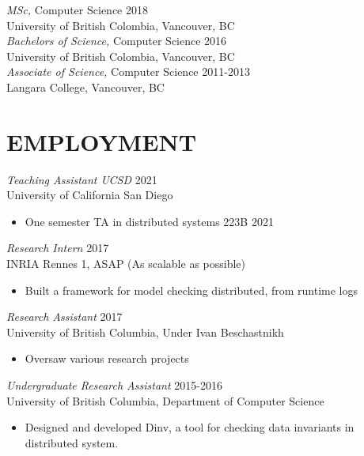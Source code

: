 \documentclass[line,margin]{res}
\begin{document}
\begin{resume}
{\sl MSc,} Computer Science \hfill 2018 \\
University of British Colombia, Vancouver, BC \\

{\sl Bachelors of Science,} Computer Science	\hfill 2016\\
University of British Colombia, Vancouver, BC \\

{\sl Associate of Science,} Computer Science \hfill 2011-2013\\
Langara College, Vancouver, BC\\


\section{EMPLOYMENT} 

{\sl Teaching Assistant UCSD} \hfill 2021\\
	University of California San Diego
\begin{itemize} \itemsep -2pt
        \item One semester TA in distributed systems 223B \hfill 2021
	\end{itemize}

{\sl Research Intern} \hfill 2017\\
    INRIA Rennes 1, ASAP (As scalable as possible)
\begin{itemize} \itemsep -2pt
        \item Built a framework for model checking distributed, from runtime logs
    \end{itemize}

{\sl Research Assistant} \hfill 2017\\
    University of British Columbia, Under Ivan Beschastnikh
\begin{itemize} \itemsep -2pt
        \item Oversaw various research projects
    \end{itemize}

{\sl Undergraduate Research Assistant} \hfill 2015-2016\\
	University of British Columbia, Department of Computer Science
\begin{itemize} \itemsep -2pt
        \item Designed and developed Dinv, a tool for checking data invariants in distributed system.
    \end{itemize}



\end{resume}
\end{document}
